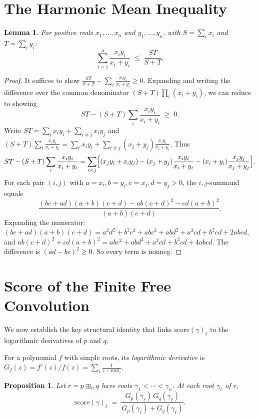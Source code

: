 \documentclass[12pt]{article}
\newtheorem{lemma}[theorem]{Lemma}
\newtheorem{proposition}[theorem]{Proposition}
\theoremstyle{definition}
\newcommand{\score}{\mathrm{score}}
\begin{document}
\section{The Harmonic Mean Inequality}

\begin{lemma}\label{lem:hm}
For positive reals $x_1,\ldots,x_n$ and $y_1,\ldots,y_n$, with $S=\sum_i x_i$ and $T=\sum_i y_i$:
\[
  \sum_{i=1}^n\frac{x_i y_i}{x_i+y_i}\;\le\;\frac{ST}{S+T}.
\]
\end{lemma}

\begin{proof}
It suffices to show $\frac{ST}{S+T}-\sum_i\frac{x_iy_i}{x_i+y_i}\ge 0$.
Expanding and writing the difference over the common denominator $(S+T)\prod_i(x_i+y_i)$, we
can reduce to showing
\[
  ST - (S+T)\sum_i\frac{x_iy_i}{x_i+y_i} \;\ge\; 0.
\]
Write $ST=\sum_i x_iy_i+\sum_{i\neq j}x_iy_j$ and
$(S+T)\sum_i\frac{x_iy_i}{x_i+y_i}=\sum_i x_iy_i+\sum_{i\neq j}(x_j+y_j)\frac{x_iy_i}{x_i+y_i}$.
Thus
\[
  ST-(S+T)\sum_i\frac{x_iy_i}{x_i+y_i}
  =\sum_{i<j}\Bigl[(x_jy_i+x_iy_j)-(x_j+y_j)\frac{x_iy_i}{x_i+y_i}-(x_i+y_i)\frac{x_jy_j}{x_j+y_j}\Bigr].
\]
For each pair $(i,j)$ with $a=x_i,b=y_i,c=x_j,d=y_j>0$, the $i,j$-summand equals
\[
  \frac{(bc+ad)(a+b)(c+d)-ab(c+d)^2-cd(a+b)^2}{(a+b)(c+d)}.
\]
Expanding the numerator: $(bc+ad)(a+b)(c+d)=a^2d^2+b^2c^2+abc^2+abd^2+a^2cd+b^2cd+2abcd$,
and $ab(c+d)^2+cd(a+b)^2=abc^2+abd^2+a^2cd+b^2cd+4abcd$.
The difference is $(ad-bc)^2\ge 0$.  So every term is nonneg.
\end{proof}

\section{Score of the Finite Free Convolution}

We now establish the key structural identity that links $\score(\gamma)_\ell$ to the logarithmic
derivatives of $p$ and $q$.

For a polynomial $f$ with simple roots, its \emph{logarithmic derivative} is
$G_f(z)=f'(z)/f(z)=\sum_i\frac{1}{z-\text{root}_i}$.

\begin{proposition}\label{prop:score-ffc}
Let $r=p\boxplus_n q$ have roots $\gamma_1<\cdots<\gamma_n$.  At each root $\gamma_\ell$ of $r$,
\begin{equation}\label{eq:score-harm}
  \score(\gamma)_\ell
  \;=\;\frac{G_p(\gamma_\ell)\,G_q(\gamma_\ell)}{G_p(\gamma_\ell)+G_q(\gamma_\ell)}.
\end{equation}
\end{proposition}
\end{document}
